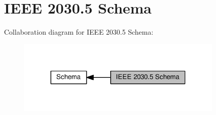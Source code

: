 \hypertarget{group__se__object}{}\section{I\+E\+EE 2030.5 Schema}
\label{group__se__object}
Collaboration diagram for I\+E\+EE 2030.5 Schema\+:\nopagebreak
\begin{figure}[H]
\begin{center}
\leavevmode
\includegraphics[width=280pt]{group__se__object}
\end{center}
\end{figure}
